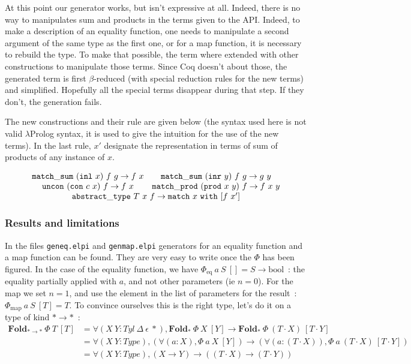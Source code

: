 \documentclass{article}
\newcommand{\fld}{\mathbf{Fold}}
\newcommand{\lprog}{$\lambda$Prolog }
\begin{document}
At this point our generator works, but isn't expressive at all. Indeed, there
is no way to manipulates sum and products in the terms given to the API. Indeed,
to make a description of an equality function, one needs to manipulate a
second argument of the same type as the first one, or for a map function,
it is necessary to rebuild the type. To make that possible, the term where
extended with other constructions to manipulate those terms. Since Coq doesn't
about those, the generated term is first $\beta$-reduced (with special reduction
rules for the new terms) and simplified. Hopefully all the special terms
disappear during that step. If they don't, the generation fails.

The new constructions and their rule are given below (the syntax used here is not valid
\lprog syntax, it is used to give the intuition for the use of the
new terms). In the last rule, $x'$ designate the representation in terms of
sum of products of any instance of $x$.

\[\begin{array}{cc}
      \mathtt{match\_sum}\ (\mathtt{inl}\ x)\ f\ g\rightarrow f\ x
    & \mathtt{match\_sum}\ (\mathtt{inr}\ y)\ f\ g\rightarrow g\ y
    \\
      \mathtt{uncon}\ (\mathtt{con}\ c\ x)\ f \rightarrow f\ x
    & \mathtt{match\_prod}\ (\mathtt{prod}\ x\ y)\ f \rightarrow f\ x\ y
    \\
    \multicolumn{2}{c}{
        \mathtt{abstract\_type}\ T\ x\ f\rightarrow \mathtt{match}\ x\ \mathtt{with}\ [f\ x']
    } \\
\end{array}\]

\subsubsection{Results and limitations}

In the files \texttt{geneq.elpi} and \texttt{genmap.elpi} generators for an
equality function and a map function can be found. They are very easy to write
once the $\Phi$ has been figured. In the case of the equality function, we
have $\Phi_{\text{eq}}\ a\ S\ [] = S \rightarrow \text{bool}$~: the
equality partially applied with $a$, and not other parameters (ie $n = 0$). For
the map we set $n = 1$, and use the element in the list of parameters for the
result~: $\Phi_{\text{map}}\ a\ S\ [T] = T$. To convince ourselves this is the
right type, let's do it on a type of kind $*\rightarrow *$~:
\begin{align*}
    \fld_{*\rightarrow *}\ \Phi\ T\ [T]
        &= \forall (X\ Y : Tyl\ \Delta\ \epsilon\ *), \fld_*\ \Phi\ X\ [Y]
            \rightarrow \fld_*\ \Phi\ (T\cdot X)\ [T\cdot Y] \\
        &= \forall (X\ Y : Type), (\forall (a : X), \Phi\ a\ X\ [Y])
            \rightarrow (\forall (a : (T\cdot X)), \Phi\ a\ (T\cdot X)\ [T\cdot Y]) \\
        &= \forall (X\ Y : Type), (X \rightarrow Y) \rightarrow ((T\cdot X)\rightarrow(T\cdot Y)) \\
\end{align*}
\end{document}

